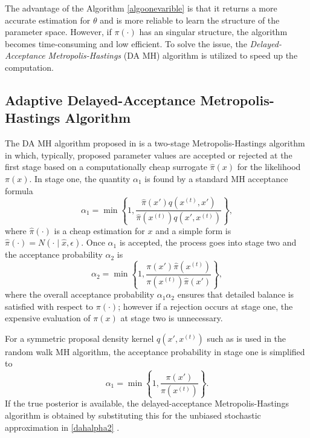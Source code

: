 The advantage of the Algorithm \ref{algoonevarible} is that it returns a more accurate estimation for $\theta$ and is more reliable to learn the structure of the parameter space. However, if $\pi(\cdot)$ has an singular structure, the algorithm becomes time-consuming and low efficient. To solve the issue, the \textit{Delayed-Acceptance Metropolis-Hastings} (DA MH) algorithm is utilized to speed up the computation.





\subsection{Adaptive Delayed-Acceptance Metropolis-Hastings Algorithm}

The DA MH algorithm proposed in \citep{christen2005markov} is a two-stage Metropolis-Hastings algorithm in which, typically, proposed parameter values are accepted or rejected at the first stage based on a computationally cheap surrogate $\hat{\pi}(x)$ for the likelihood $\pi(x)$. In stage one, the quantity $\alpha_1$ is found by a standard MH acceptance formula 
\begin{equation*}
\alpha_1=\min\left\lbrace  1,\frac{\hat{\pi}(x')q\left(x^{(t)}, x'\right)}{\hat{\pi}(x^{(t)})q\left(x', x^{(t)}\right)}  \right\rbrace ,
\end{equation*}
where $\hat{\pi}(\cdot)$ is a cheap estimation for $x$ and a simple form is $\hat{\pi}(\cdot)=N\left(\cdot\mid \hat{x},\epsilon\right)$. Once $\alpha_1$ is accepted, the process goes into stage two and the acceptance probability $\alpha_2$ is
\begin{equation}\label{dahalpha2}
\alpha_2=\min \left\lbrace  1,\frac{\pi(x')\hat{\pi}\left(x^{(t)}\right) }{\pi\left(x^{(t)}\right)\hat{\pi}(x')} \right\rbrace,
\end{equation}
where the overall acceptance probability $\alpha_1\alpha_2$ ensures that detailed balance is satisfied with respect to $\pi(\cdot)$; however if a rejection occurs at stage one, the expensive evaluation of $\pi(x)$ at stage two is unnecessary.

For a symmetric proposal density kernel $q\left(x', x^{(t)}\right)$ such as is used in the random walk MH algorithm, the acceptance probability in stage one is simplified to
\begin{equation} \label{dahalpha1}
\alpha_1= \min \left\lbrace 1,\frac{\pi(x')}{\pi\left(x^{(t)}\right)}  \right\rbrace.
\end{equation}
If the true posterior is available, the delayed-acceptance Metropolis-Hastings algorithm is obtained by substituting this for the unbiased stochastic approximation in \eqref{dahalpha2} \citep{sherlock2015efficiency}.


